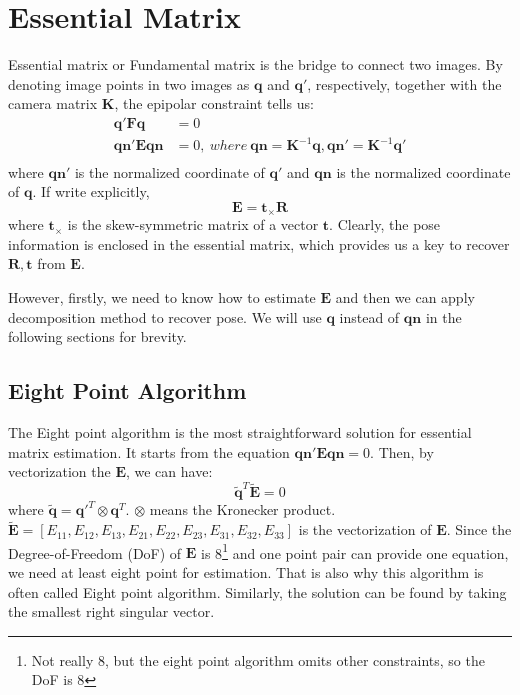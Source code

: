 \documentclass[a4paper]{report}
\begin{document}
\section{Essential Matrix}
Essential matrix or Fundamental matrix is the bridge to connect two images. By denoting image points in two images as $\mathbf{q}$ and $\mathbf{q}'$, respectively, together with the camera matrix $\mathbf{K}$, the epipolar constraint tells us:
\begin{align*}
	\mathbf{q}'\mathbf{F}\mathbf{q}&=0 \\
	\mathbf{qn}'\mathbf{E}\mathbf{qn}&=0,\ where\ \mathbf{qn}=\mathbf{K}^{-1}\mathbf{q}, \mathbf{qn}' = \mathbf{K}^{-1}\mathbf{q}'\\
\end{align*}
where $\mathbf{qn}'$ is the normalized coordinate of $\mathbf{q}'$ and $\mathbf{qn}$ is the normalized coordinate of $\mathbf{q}$. 
If write explicitly, 
$$
\mathbf{E}=\mathbf{t}_{\times} \mathbf{R}
$$
where $\mathbf{t}_{\times}$ is the skew-symmetric matrix of a vector $\mathbf{t}$.
Clearly, the pose information is enclosed in the essential matrix, which provides us a key to recover $\mathbf{R,t}$ from $\mathbf{E}$.

However, firstly, we need to know how to estimate $\mathbf{E}$ and then we can apply decomposition method to recover pose. We will use $\mathbf{q}$ instead of $\mathbf{qn}$ in the following sections for brevity.

\subsection{Eight Point Algorithm} 
The Eight point algorithm is the most straightforward solution for essential matrix estimation. It starts from the equation $\mathbf{qn}'\mathbf{E}\mathbf{qn}=0$. Then, by vectorization the $\mathbf{E}$, we can have:
$$
\tilde{\mathbf{q}}^T\tilde{\mathbf{E}}=0
$$
where $\tilde{\mathbf{q}}=\mathbf{q}'^T \otimes \mathbf{q}^T$. $\otimes$ means the Kronecker product. $\tilde{\mathbf{E}}=[E_{11},E_{12},E_{13},E_{21},E_{22},E_{23},E_{31},E_{32},E_{33}]$ is the vectorization of $\mathbf{E}$. Since the Degree-of-Freedom (DoF) of $\mathbf{E}$ is 8\footnote{Not really 8, but the eight point algorithm omits other constraints, so the DoF is 8} and one point pair can provide one equation, we need at least eight point for estimation. That is also why this algorithm is often called Eight point algorithm. Similarly, the solution can be found by taking the smallest right singular vector. 
\end{document}
